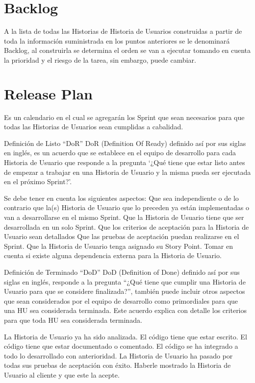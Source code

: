 \section{Backlog}
A la lista de todas las Historias de Historia de Usuarios construidas a partir de toda la información suministrada en los puntos anteriores se le denominará Backlog, al construirla  se determina el orden se van a ejecutar tomando en cuenta la prioridad y el riesgo de la tarea, sin embargo, puede cambiar. 

\section{Release Plan}
Es un calendario en el cual se agregarán los Sprint que sean necesarios para que todas las Historias de Usuarios sean cumplidas a cabalidad.

Definición de Listo “DoR”
DoR (Definition Of Ready) definido así por sus siglas en inglés, es un acuerdo que se establece
en el equipo de desarrollo para cada Historia de Usuario que responde a la pregunta ‘¿Qué tiene que estar listo antes de empezar a trabajar en una Historia de Usuario y la misma pueda ser ejecutada en el próximo Sprint?’.

Se debe tener en cuenta los siguientes aspectos: 
Que sea independiente o de lo contrario que la(s) Historia de Usuario que lo preceden ya están implementadas o van a desarrollarse en el mismo Sprint.
Que la Historia de Usuario tiene que ser desarrollada en un solo Sprint.
Que los criterios de aceptación para la Historia de Usuario sean detallados
Que las pruebas de aceptación puedan realizarse en el Sprint.
Que la Historia de Usuario tenga asignado su Story Point.
Tomar en cuenta si existe alguna dependencia externa para la Historia de Usuario.

Definición de Terminado “DoD”
DoD (Definition of Done) definido así por sus siglas en inglés, responde a la pregunta “¿Qué tiene que cumplir una Historia de Usuario para que se considere finalizada?”, también puede incluir otros aspectos que sean considerados por el equipo de desarrollo como primordiales para que una HU sea considerada terminada. Este acuerdo explica con detalle los criterios para que toda HU sea considerada terminada.

La Historia de Usuario ya ha sido analizada.
El código tiene que estar escrito.
El código tiene que estar documentado o comentado.
El código se ha integrado a todo lo desarrollado con anterioridad.
La Historia de Usuario ha pasado por todas sus pruebas de aceptación con éxito.
Haberle mostrado la Historia de Usuario al cliente y que este la acepte.

